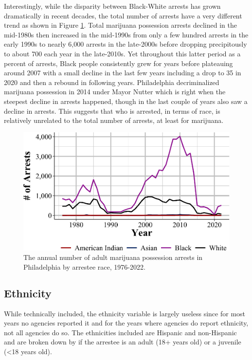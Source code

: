 \documentclass[
  12pt,
  openany]{book}
\begin{document}
Interestingly, while the disparity between Black-White arrests has grown dramatically in recent decades, the total number of arrests have a very different trend as shown in Figure \ref{fig:phillyMarijuanaRaceCount}. Total marijuana possession arrests declined in the mid-1980s then increased in the mid-1990s from only a few hundred arrests in the early 1990s to nearly 6,000 arrests in the late-2000s before dropping precipitously to about 700 each year in the late-2010s. Yet throughout this latter period as a percent of arrests, Black people consistently grew for years before plateauing around 2007 with a small decline in the last few years including a drop to 35 in 2020 and then a rebound in following years. Philadelphia decriminalized marijuana possession in 2014 under Mayor Nutter which is right when the steepest decline in arrests happened, though in the last couple of years also saw a decline in arrests. This suggests that who is arrested, in terms of race, is relatively unrelated to the total number of arrests, at least for marijuana.

\begin{figure}

{\centering \includegraphics[width=0.9\linewidth]{05_arrests_files/figure-latex/phillyMarijuanaRaceCount-1} 

}

\caption{The annual number of adult marijuana possession arrests in Philadelphia by arrestee race, 1976-2022.}\label{fig:phillyMarijuanaRaceCount}
\end{figure}

\subsection{Ethnicity}\label{ethnicity}

While technically included, the ethnicity variable is largely useless since for most years no agencies reported it and for the years where agencies do report ethnicity, not all agencies do so. The ethnicities included are Hispanic and non-Hispanic and are broken down by if the arrestee is an adult (18+ years old) or a juvenile (\textless18 years old).
\end{document}
